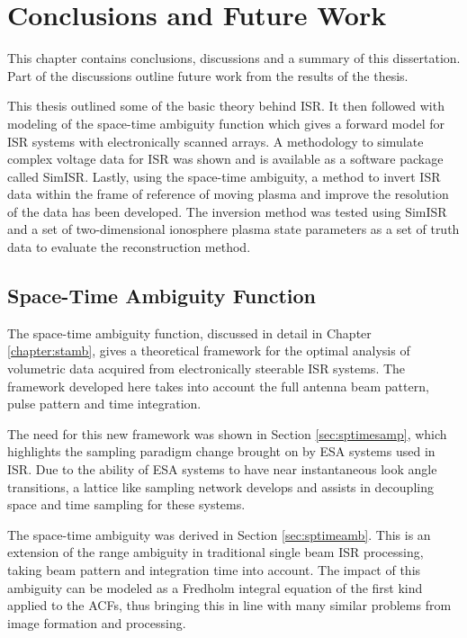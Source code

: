 \chapter{Conclusions and Future Work}
\label{chapter:Conclusions}
\thispagestyle{myheadings}
\graphicspath{{6_Conclusion/Figures/}}

\graphicspath{{6_Conclusion/Figures/}}
This chapter contains conclusions, discussions and a summary of this dissertation. Part of the discussions  outline future work from the results of the thesis.

This thesis outlined some of the basic theory behind ISR. It then followed with modeling of the space-time ambiguity function which gives a forward model for ISR systems with electronically scanned arrays. A methodology to simulate complex voltage data for ISR was shown and is available as a software package called SimISR. Lastly, using the space-time ambiguity, a method to invert ISR data within the frame of reference of moving plasma and improve the resolution of the data has been developed. The inversion method was tested using SimISR and a set of two-dimensional ionosphere plasma state parameters as a set of truth data to evaluate the reconstruction method.

\section{Space-Time Ambiguity Function}
The space-time ambiguity function, discussed in detail in Chapter \ref{chapter:stamb}, gives a theoretical framework for the optimal analysis of volumetric data acquired from electronically steerable ISR systems. The framework developed here takes into account the full antenna beam pattern, pulse pattern and time integration.

The need for this new framework was shown in Section \ref{sec:sptimesamp}, which highlights the sampling paradigm change brought on by ESA systems used in ISR. Due to the ability of ESA systems to have near instantaneous look angle transitions, a lattice like sampling network develops and assists in decoupling space and time sampling for these systems.

The space-time ambiguity was derived in Section \ref{sec:sptimeamb}. This is an extension of the range ambiguity in traditional single beam ISR processing, taking beam pattern and integration time into account. The impact of this ambiguity can be modeled as a Fredholm integral equation of the first kind applied to the ACFs, thus bringing this in line with many similar problems from image formation and processing.


